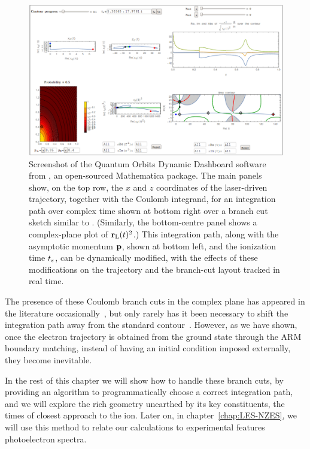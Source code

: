 \begin{figure}[htb]
  \centering
  \includegraphics[width=\textwidth]{5-Quantum-orbits/Figures/figure5M.png}
  \captionsetup{width=\textwidth}
  \caption[
  Screenshot of the Quantum Orbits Dynamic Dashboard software
  ]{
  Screenshot of the Quantum Orbits Dynamic Dashboard software from , an open-sourced Mathematica package. The main panels show, on the top row, the $x$ and $z$ coordinates of the laser-driven trajectory, together with the Coulomb integrand, for an integration path over complex time shown at bottom right over a branch cut sketch similar to . (Similarly, the bottom-centre panel shows a complex-plane plot of $\vb{r}_\mathrm{L}(t)^2$.) This integration path, along with the asymptotic momentum $\vb{p}$, shown at bottom left, and the ionization time ${t_s}$, can be dynamically modified, with the effects of these modifications on the trajectory and the branch-cut layout tracked in real time.
  }
\label{f5-quodd-screenshot}
\end{figure}






The presence of these Coulomb branch cuts in the complex plane has appeared in the literature occasionally~\cite{popruzhenko_branch-cuts_2014}, but only rarely has it been necessary to shift the integration path away from the standard contour~\cite{ popruzhenko_branch-cuts_2014, Milosevic_scattering_large}. However, as we have shown, once the electron trajectory is obtained from the ground state through the ARM boundary matching, instead of having an initial condition imposed externally, they become inevitable.

In the rest of this chapter we will show how to handle these branch cuts, by providing an algorithm to programmatically choose a correct integration path, and we will explore the rich geometry unearthed by its key constituents, the times of closest approach to the ion. Later on, in chapter~\ref{chap:LES-NZES}, we will use this method to relate our calculations to experimental features photoelectron spectra. 

